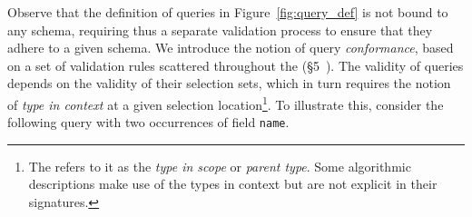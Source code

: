 Observe that the definition of queries in Figure~\ref{fig:query_def}
is not bound to any schema, requiring thus a separate validation
process to ensure that they adhere to a given schema. We introduce the
notion of query \textit{conformance}, based on a set of validation
rules scattered throughout the \spec (\cf\S5~\cite{gqlspec}). The
validity of queries depends on the validity of their selection sets,
which in turn requires the notion of \textit{type in context} at a
given selection location\footnote{The \spec refers to it as the \emph{type in scope} or \emph{parent type}. Some algorithmic descriptions make use of the types in context but are not explicit in their signatures.}. %
To illustrate this, consider the following query with two occurrences of field \texttt{name}.

